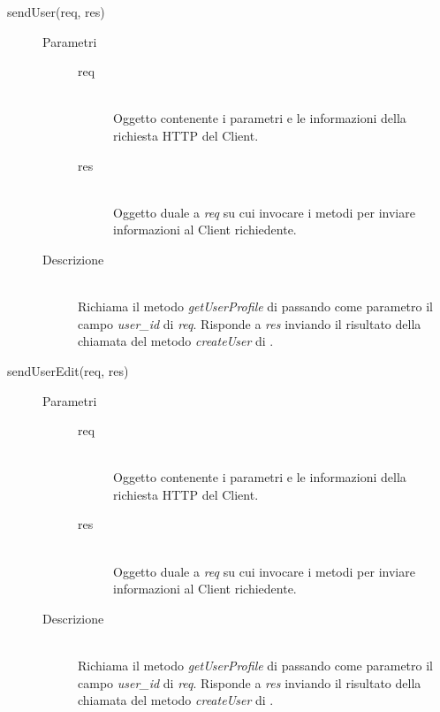 \begin{description}
\begin{description}
    \item[sendUser(req, res)] \hfill
      \begin{description}
	\item[Parametri] \hfill
	  \begin{description}
	    \item[req] \hfill \\
	    Oggetto contenente i parametri e le informazioni della richiesta HTTP del Client.
	    \item[res] \hfill \\
	    Oggetto duale a \textit{req} su cui invocare i metodi per inviare informazioni al Client richiedente.
	  \end{description}
	\item[Descrizione] \hfill \\
	Richiama il metodo \textit{getUserProfile} di  passando come parametro il campo \textit{user\_id} di \textit{req}. Risponde a \textit{res} inviando il risultato della chiamata del metodo \textit{createUser} di .
      \end{description}
      
    \item[sendUserEdit(req, res)] \hfill
      \begin{description}
	\item[Parametri] \hfill
	  \begin{description}
	    \item[req] \hfill \\
	    Oggetto contenente i parametri e le informazioni della richiesta HTTP del Client.
	    \item[res] \hfill \\
	    Oggetto duale a \textit{req} su cui invocare i metodi per inviare informazioni al Client richiedente.
	  \end{description}
	\item[Descrizione] \hfill \\
	Richiama il metodo \textit{getUserProfile} di  passando come parametro il campo \textit{user\_id} di \textit{req}. Risponde a \textit{res} inviando il risultato della chiamata del metodo \textit{createUser} di .
      \end{description}
	

\end{description}
\end{description}
